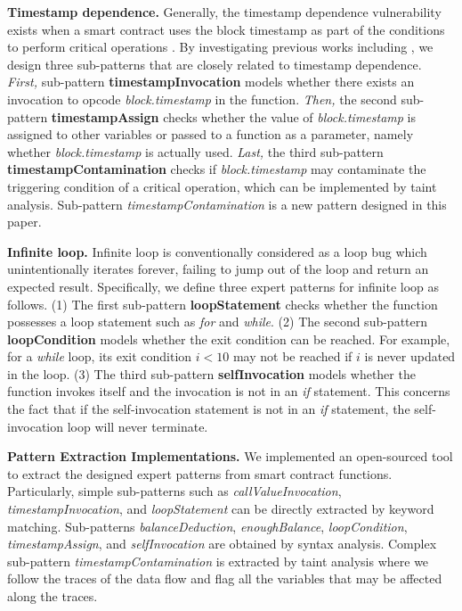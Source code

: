 \textbf{Timestamp dependence.} Generally, the timestamp dependence vulnerability exists when a smart contract uses the block timestamp as part of the conditions to perform critical operations \cite{contractfuzzer}. By investigating previous works including \cite{Sok,oyente,contractfuzzer}, we design three sub-patterns that are closely related to timestamp dependence. \emph{First,} sub-pattern \textbf{timestampInvocation} models whether there exists  an invocation to opcode \emph{block.timestamp} in the function. \emph{Then,} the second sub-pattern \textbf{timestampAssign} checks whether the value of \emph{block.timestamp} is assigned to other variables or passed to a function as a parameter, namely whether \emph{block.timestamp} is actually used. \emph{Last,} the third sub-pattern \textbf{timestampContamination} checks if \emph{block.timestamp} may contaminate the triggering condition of a critical operation, which can be implemented by taint analysis. Sub-pattern \emph{timestampContamination} is a new pattern designed in this paper.

\textbf{Infinite loop.} Infinite loop is conventionally considered as a loop bug which unintentionally iterates forever, failing to jump out of the loop and return an expected result. Specifically, we define three expert patterns for infinite loop as follows. (1) The first sub-pattern \textbf{loopStatement} checks whether the function possesses a loop statement such as \emph{for} and \emph{while}. (2) The second sub-pattern \textbf{loopCondition} models whether the exit condition can be reached. For example, for a \emph{while} loop, its exit condition $i<10$ may not be reached if $i$ is never updated in the loop. (3) The third sub-pattern \textbf{selfInvocation} models whether the function invokes itself and the invocation is not in an \emph{if} statement. This concerns the fact that if the self-invocation statement is not in an \emph{if} statement, the self-invocation loop will never terminate.

\textbf{Pattern Extraction Implementations.} We implemented an open-sourced tool to extract the designed expert patterns from smart contract functions. Particularly, simple sub-patterns such as \emph{callValueInvocation}, \emph{timestampInvocation}, and \emph{loopStatement} can be directly extracted by keyword matching. Sub-patterns \emph{balanceDeduction}, \emph{enoughBalance}, \emph{loopCondition}, \emph{timestampAssign}, and \emph{selfInvocation} are obtained by syntax analysis. Complex sub-pattern \emph{timestampContamination} is extracted by taint analysis where we follow the traces of the data flow and flag all the variables that may be affected along the traces.

